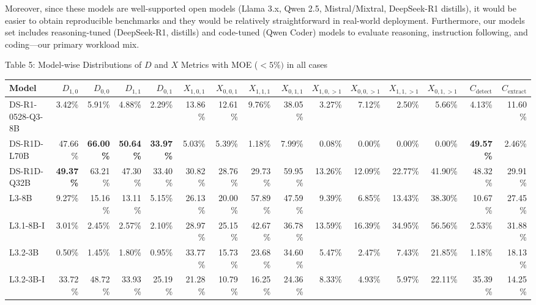 \documentclass[conference]{IEEEtran}
\begin{document}
Moreover, since these models are well-supported open models (Llama 3.x, Qwen 2.5, Mistral/Mixtral, DeepSeek\mbox{-}R1 distills), it would be easier to obtain reproducible benchmarks and they would be relatively straightforward in real-world  deployment. Furthermore, our models set includes reasoning-tuned (DeepSeek\mbox{-}R1, distills) and code-tuned (Qwen Coder) models to evaluate reasoning, instruction following, and coding---our primary workload mix.

 


\begin{table}[ht]
  \centering
  \scriptsize
  \setlength{\tabcolsep}{3pt}
  Table 5: {Model-wise Distributions of $D$ and $X$ Metrics with MOE ($< 5\%)$ in all cases}
  \label{tab:results_metrics}
  \begin{tabular}{l*{14}{r}}
    \toprule
    \textbf{Model}
      & $D_{1,0}$ & $D_{0,0}$ & $D_{1,1}$ & $D_{0,1}$
      & $X_{1,0,1}$ & $X_{0,0,1}$ & $X_{1,1,1}$ & $X_{0,1,1}$
      & $X_{1,0,>1}$ & $X_{0,0,>1}$ & $X_{1,1,>1}$ & $X_{0,1,>1}$ &  $C_{\mathrm{detect}}$
      & $C_{\mathrm{extract}}$ \\
    \midrule
    DS-R1-0528-Q3-8B    & 3.42\% & 5.91\% & 4.88\% & 2.29\% & 13.86\% & 12.61\% & 9.76\%  & 38.05\% & 3.27\%  & 7.12\%  & 2.50\%  & 5.66\%  & 4.13\%  & 11.60\%   \\
    DS-R1D-L70B         & 47.66\%& \textbf{66.00\%}& \textbf{50.64\%}& \textbf{33.97\%}& 5.03\%  & 5.39\%  & 1.18\%  & 7.99\%  & 0.08\%  & 0.00\%  & 0.00\%  & 0.00\%  & \textbf{49.57\%} & 2.46\%    \\
    {DS-R1D-Q32B}& \textbf{49.37\%}& 63.21\%& 47.30\%& 33.40\%& 30.82\% & 28.76\% & 29.73\% & 59.95\% & 13.26\% & 12.09\% & 22.77\% & 41.90\% & 48.32\% & 29.91\%  \\
    L3-8B               & 9.27\% & 15.16\%& 13.11\%& 5.15\% & 26.13\% & 20.00\% & 57.89\% & 47.59\% & 9.39\%  & 6.85\%  & 13.43\% & 38.30\% & 10.67\% & 27.45\%   \\
    L3.1-8B-I           & 3.01\% & 2.45\% & 2.57\% & 2.10\% & 28.97\% & 25.15\% & 42.67\% & 36.78\% & 13.59\% & 16.39\% & 34.95\% & 56.56\% & 2.53\%  & 31.88\%   \\
    L3.2-3B             & 0.50\% & 1.45\% & 1.80\% & 0.95\% & 33.77\% & 15.73\% & 23.68\% & 34.60\% & 5.47\%  & 2.47\%  & 7.43\%  & 21.85\% & 1.18\%  & 18.13\%   \\
    L3.2-3B-I           & 33.72\%& 48.72\%& 33.93\%& 25.19\%& 21.28\% & 10.79\% & 16.25\% & 24.36\% & 8.33\%  & 4.93\%  & 5.97\%  & 22.11\% & 35.39\% & 14.25\%  \\

\end{tabular}
\end{table}
\end{document}
